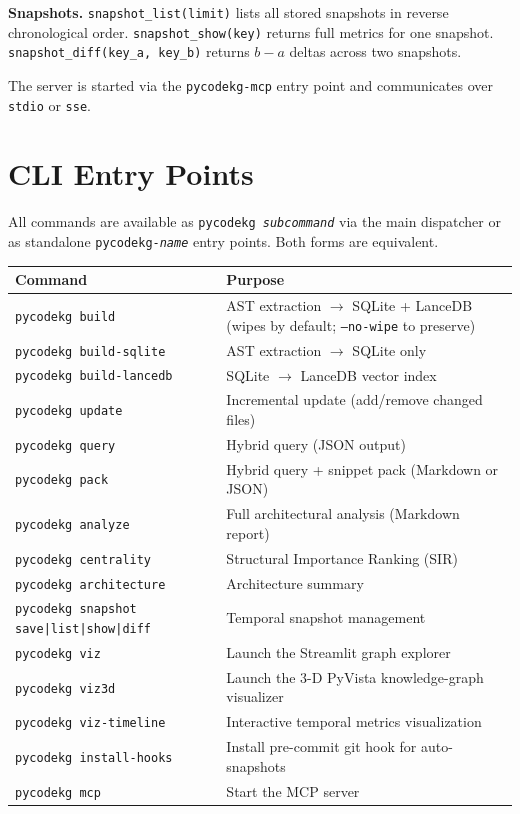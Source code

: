 \documentclass[10pt]{article}
\begin{document}
\textbf{Snapshots.}
\texttt{snapshot\_list(limit)} lists all stored snapshots in reverse chronological
order.  \texttt{snapshot\_show(key)} returns full metrics for one snapshot.
\texttt{snapshot\_diff(key\_a, key\_b)} returns $b - a$ deltas across two snapshots.

The server is started via the \texttt{pycodekg-mcp} entry point and communicates
over \texttt{stdio} or \texttt{sse}.

\section{CLI Entry Points}

All commands are available as \texttt{pycodekg \textit{subcommand}} via the main
dispatcher or as standalone \texttt{pycodekg-\textit{name}} entry points.  Both
forms are equivalent.

\begin{center}
\begin{tabular}{ll}
\toprule
Command & Purpose \\
\midrule
\texttt{pycodekg build} & AST extraction $\to$ SQLite + LanceDB (wipes by default; \texttt{--no-wipe} to preserve) \\
\texttt{pycodekg build-sqlite} & AST extraction $\to$ SQLite only \\
\texttt{pycodekg build-lancedb} & SQLite $\to$ LanceDB vector index \\
\texttt{pycodekg update} & Incremental update (add/remove changed files) \\
\texttt{pycodekg query} & Hybrid query (JSON output) \\
\texttt{pycodekg pack} & Hybrid query + snippet pack (Markdown or JSON) \\
\texttt{pycodekg analyze} & Full architectural analysis (Markdown report) \\
\texttt{pycodekg centrality} & Structural Importance Ranking (SIR) \\
\texttt{pycodekg architecture} & Architecture summary \\
\texttt{pycodekg snapshot save|list|show|diff} & Temporal snapshot management \\
\texttt{pycodekg viz} & Launch the Streamlit graph explorer \\
\texttt{pycodekg viz3d} & Launch the 3-D PyVista knowledge-graph visualizer \\
\texttt{pycodekg viz-timeline} & Interactive temporal metrics visualization \\
\texttt{pycodekg install-hooks} & Install pre-commit git hook for auto-snapshots \\
\texttt{pycodekg mcp} & Start the MCP server \\
\bottomrule
\end{tabular}
\end{center}
\end{document}
